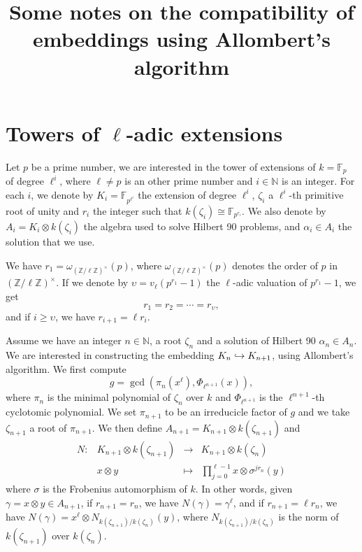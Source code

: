 \documentclass[a4paper,11pt]{article}
\title{Some notes on the compatibility of embeddings using Allombert's algorithm}
\author{}
\begin{document}
\maketitle





\section{Towers of $\ell$-adic extensions}

Let $p$ be a prime number, we are interested in the tower of extensions of
$k=\mathbb{F}_p$ of degree $\ell^i$, where $\ell\neq p$ is an other prime
number and $i\in\mathbb{N}$ is an integer. For each $i$, we denote by
$K_i=\mathbb{F}_{p^{\ell^i}}$ the extension of degree $\ell^i$, $\zeta_i$ a
$\ell^i$-th primitive root of unity and $r_i$ the integer such that
$k(\zeta_i)\cong\mathbb{F}_{p^{r_i}}$. We also denote by $A_i=K_i\otimes
k(\zeta_i)$ the algebra used to solve Hilbert 90 problems, and $\alpha_i\in A_i$ the
solution that we use.

We have $r_1=\omega_{(\mathbb{Z}/\ell\mathbb{Z})^\times}(p)$, where
$\omega_{(\mathbb{Z}/\ell\mathbb{Z})^\times}(p)$ denotes the order of $p$ in
$(\mathbb{Z}/\ell\mathbb{Z})^\times$. If we denote by $\upsilon=v_\ell(p^{r_1}-1)$
the $\ell$-adic valuation of $p^{r_1}-1$, we get 
\[
  r_1 = r_2 = \cdots = r_{\upsilon},
\]
and if $i\geq\upsilon$, we have $r_{i+1}=\ell r_i$.

Assume we have an integer $n\in\mathbb{N}$, a root
$\zeta_n$ and a solution of Hilbert 90 $\alpha_n\in A_n$. We are interested in
constructing the embedding $K_n\hookrightarrow K_{n+1}$, using Allombert's algorithm. We
first compute 
\[
  g = \gcd(\pi_n(x^\ell), \Phi_{\ell^{n+1}}(x)),
\]
where $\pi_n$ is the minimal polynomial of $\zeta_n$ over $k$ and
$\Phi_{\ell^{n+1}}$ is the $\ell^{n+1}$-th cyclotomic polynomial. We set
$\pi_{n+1}$ to be an irreducicle factor of $g$ and we take $\zeta_{n+1}$ a root
of $\pi_{n+1}$. We then define $A_{n+1}=K_{n+1}\otimes k(\zeta_{n+1})$ and
\[
\begin{array}{cccc}
  N: & K_{n+1}\otimes k(\zeta_{n+1}) & \to & K_{n+1}\otimes k(\zeta_n) \\
  & x\otimes y & \mapsto & \prod_{j=0}^{\ell-1} x \otimes \sigma^{jr_n}(y)
\end{array}
\]
where $\sigma$ is the Frobenius automorphism of $k$. In other words, given
$\gamma=x\otimes y\in A_{n+1}$, if $r_{n+1}=r_n$, we have $N(\gamma) =
\gamma^\ell$, and if $r_{n+1}=\ell r_n$, we have $N(\gamma) = x^\ell\otimes
N_{k(\zeta_{n+1})/k(\zeta_n)}(y)$, where $N_{k(\zeta_{n+1})/k(\zeta_n)}$ is the
norm of $k(\zeta_{n+1})$ over $k(\zeta_n)$. 
\end{document}
